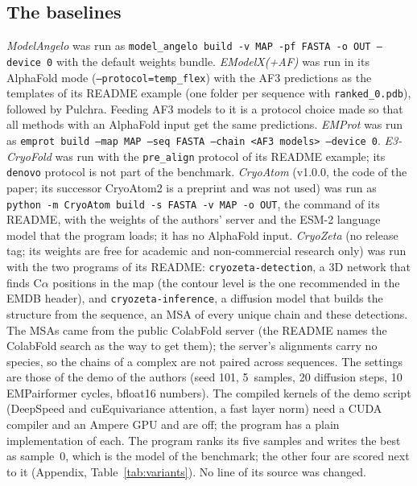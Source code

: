 \subsection{The baselines}
\emph{ModelAngelo} \citep{jamali2024modelangelo} was run as \texttt{model\_angelo build -v MAP -pf FASTA -o OUT --device 0} with the default weights bundle. \emph{EModelX(+AF)} \citep{chen2024emodelx} was run in its AlphaFold mode (\texttt{--protocol=temp\_flex}) with the AF3 predictions as the templates of its README example (one folder per sequence with \texttt{ranked\_0.pdb}), followed by Pulchra. Feeding AF3 models to it is a protocol choice made so that all methods with an AlphaFold input get the same predictions. \emph{EMProt} \citep{li2026emprot} was run as \texttt{emprot build --map MAP --seq FASTA --chain <AF3 models> --device 0}. \emph{E3-CryoFold} \citep{wang2025e3cryofold} was run with the \texttt{pre\_align} protocol of its README example; its \texttt{denovo} protocol is not part of the benchmark. \emph{CryoAtom} \citep{su2026cryoatom} (v1.0.0, the code of the paper; its successor CryoAtom2 is a preprint and was not used) was run as \texttt{python -m CryoAtom build -s FASTA -v MAP -o OUT}, the command of its README, with the weights of the authors' server and the ESM-2 language model that the program loads; it has no AlphaFold input. \emph{CryoZeta} \citep{zhang2026cryozeta} (no release tag; its weights are free for academic and non-commercial research only) was run with the two programs of its README: \texttt{cryozeta-detection}, a 3D network that finds C$\alpha$ positions in the map (the contour level is the one recommended in the EMDB header), and \texttt{cryozeta-inference}, a diffusion model that builds the structure from the sequence, an MSA of every unique chain and these detections. The MSAs came from the public ColabFold server (the README names the ColabFold search as the way to get them); the server's alignments carry no species, so the chains of a complex are not paired across sequences. The settings are those of the demo of the authors (seed 101, 5~samples, 20 diffusion steps, 10 EMPairformer cycles, bfloat16 numbers). The compiled kernels of the demo script (DeepSpeed and cuEquivariance attention, a fast layer norm) need a CUDA compiler and an Ampere GPU and are off; the program has a plain implementation of each. The program ranks its five samples and writes the best as sample~0, which is the model of the benchmark; the other four are scored next to it (Appendix, Table~\ref{tab:variants}). No line of its source was changed.

